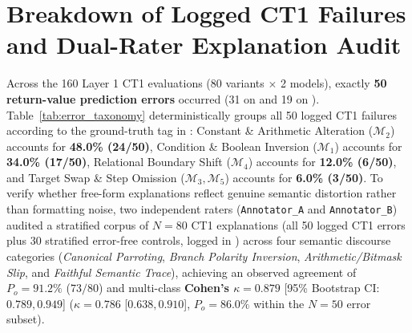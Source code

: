 \documentclass[runningheads]{llncs}
\begin{document}
\section{Breakdown of Logged CT1 Failures and Dual-Rater Explanation Audit}
Across the 160 Layer 1 CT1 evaluations (80 variants $\times$ 2 models), exactly \textbf{50 return-value prediction errors} occurred (31 on  and 19 on ). Table~\ref{tab:error_taxonomy} deterministically groups all 50 logged CT1 failures according to the ground-truth  tag in : Constant \& Arithmetic Alteration ($\mathcal{M}_2$) accounts for \textbf{48.0\% (24/50)}, Condition \& Boolean Inversion ($\mathcal{M}_1$) accounts for \textbf{34.0\% (17/50)}, Relational Boundary Shift ($\mathcal{M}_4$) accounts for \textbf{12.0\% (6/50)}, and Target Swap \& Step Omission ($\mathcal{M}_3, \mathcal{M}_5$) accounts for \textbf{6.0\% (3/50)}. To verify whether free-form explanations reflect genuine semantic distortion rather than formatting noise, two independent raters (\texttt{Annotator\_A} and \texttt{Annotator\_B}) audited a stratified corpus of $N=80$ CT1 explanations (all 50 logged CT1 errors plus 30 stratified error-free controls, logged in ) across four semantic discourse categories (\textit{Canonical Parroting}, \textit{Branch Polarity Inversion}, \textit{Arithmetic/Bitmask Slip}, and \textit{Faithful Semantic Trace}), achieving an observed agreement of $P_o = 91.2\%$ ($73/80$) and multi-class \textbf{Cohen's $\kappa = 0.879$} [95\% Bootstrap CI: $0.789, 0.949$] ($\kappa = 0.786$ [$0.638, 0.910$], $P_o = 86.0\%$ within the $N=50$ error subset).

\begin{table}[t]
\caption{Deterministic grouping of all 50 logged CT1 errors (31 LLaMA-3.1 + 19 Qwen2.5-Coder) by ground-truth mutation operator family in \texttt{results/benchmark\_raw\_logs.json}.}\label{tab:error_taxonomy}
\centering
{}
\end{table}
\end{document}
